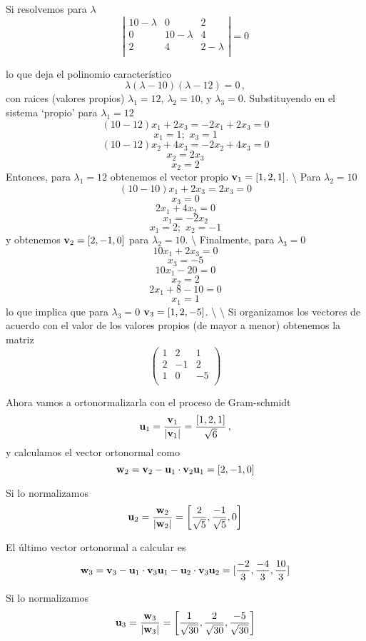 \documentclass[
]{agujournal2019}
\begin{document}
Si resolvemos para \(\lambda\) \[\left|\begin{array}{ccc}
  10-\lambda & 0 & 2 \\
  0 & 10-\lambda & 4\\
  2 & 4 & 2-\lambda\\
      \end{array}\right|=0\]

lo que deja el polinomio característico
\[\lambda (\lambda-10)(\lambda-12)=0\,,\] con raices (valores propios)
\(\lambda_1=12\), \(\lambda_2=10\), y \(\lambda_3=0\). Substituyendo en
el sistema `propio' para \(\lambda_1=12\)
\[(10-12)x_1 + 2x_3 = -2x_1+2x_3=0\] \[x_1=1;\,\,x_3=1\]
\[(10-12)x_2 + 4x_3 = -2x_2+4x_3=0\] \[x_2=2x_3\] \[x_2=2\] Entonces,
para \(\lambda_1=12\) obtenemos el vector propio
\({\textbf v}_1=[1,2,1]\). \textbackslash{} Para \(\lambda_2=10\)
\[(10-10)x_1 + 2x_3=2x_3=0\] \[x_3=0\] \[2x_1+4x_2=0\] \[x_1=-2x_2\]
\[x_1=2;\,\,x_2=-1\] y obtenemos \({\textbf v}_2=[2,-1,0]\) para
\(\lambda_2=10\). \textbackslash{} Finalmente, para \(\lambda_3=0\)
\[10x_1+2x_3=0\] \[x_3=-5\] \[10x_1-20=0\] \[x_2=2\] \[2x_1+8-10=0\]
\[x_1=1\] lo que implica que para \(\lambda_3=0\)
\({\textbf v}_3=[1,2,-5]\). \textbackslash{} \textbackslash{} Si
organizamos los vectores de acuerdo con el valor de los valores propios
(de mayor a menor) obtenemos la matriz \[\left(\begin{array}{ccc}
  1 & 2 & 1 \\
  2 & -1 & 2\\
  1 & 0 & -5\\
      \end{array}\right)\]

Ahora vamos a ortonormalizarla con el proceso de Gram-schmidt
\[{\textbf u}_1=\frac{{\textbf v}_1}{|{\textbf v}_1|}=\frac{[1,2,1]}{\sqrt{6}}\,,\]
y calculamos el vector ortonormal como
\[{\textbf w}_2={\textbf v}_2-{\textbf u}_1\cdot{\textbf v}_2{\textbf u}_1=[2,-1,0]\]

Si lo normalizamos
\[{\textbf u}_2=\frac{{\textbf w}_2}{|{\textbf w}_2|}=\left[ \frac{2}{\sqrt{5}}, \frac{-1}{\sqrt{5}} , 0 \right]\]

El último vector ortonormal a calcular es
\[{\textbf w}_3={\textbf v}_3-{\textbf u}_1\cdot{\textbf v}_3{\textbf u}_1 - {\textbf u}_2\cdot{\textbf v}_3{\textbf u}_2=[\frac{-2}{3},\frac{-4}{3},\frac{10}{3}]\]

Si lo normalizamos
\[{\textbf u}_3=\frac{{\textbf w}_3}{|{\textbf w}_3|}=\left[ \frac{1}{\sqrt{30}}, \frac{2}{\sqrt{30}} , \frac{-5}{\sqrt{30}} \right]\]
\end{document}
